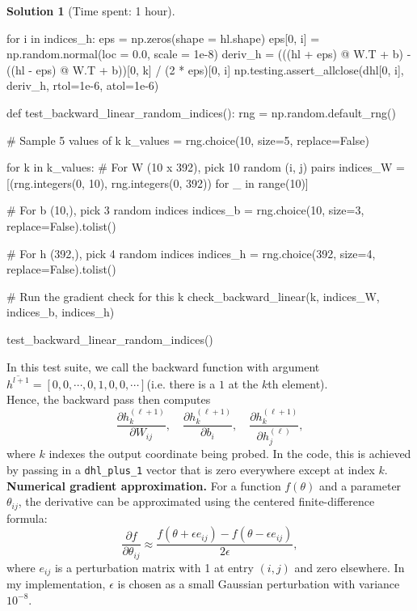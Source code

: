 \documentclass[11pt, reqno, letterpaper, twoside]{amsart}
\theoremstyle{plain}
\theoremstyle{definition}
\newtheorem{solution}[theorem]{Solution}
\begin{document}
\begin{solution}[Time spent: 1 hour]
\begin{enumerate}
\begin{python}
    for i in indices_h:
        eps = np.zeros(shape = hl.shape)
        eps[0, i] = np.random.normal(loc = 0.0, scale = 1e-8)
        deriv_h = (((hl + eps) @ W.T + b) - ((hl - eps) @ W.T + b))[0, k] / (2 * eps)[0, i]
        np.testing.assert_allclose(dhl[0, i], deriv_h, rtol=1e-6, atol=1e-6)

def test_backward_linear_random_indices():
    rng = np.random.default_rng()

    # Sample 5 values of k
    k_values = rng.choice(10, size=5, replace=False)

    for k in k_values:
        # For W (10 x 392), pick 10 random (i, j) pairs
        indices_W = [(rng.integers(0, 10), rng.integers(0, 392)) for _ in range(10)]
        
        # For b (10,), pick 3 random indices
        indices_b = rng.choice(10, size=3, replace=False).tolist()
        
        # For h (392,), pick 4 random indices
        indices_h = rng.choice(392, size=4, replace=False).tolist()

        # Run the gradient check for this k
        check_backward_linear(k, indices_W, indices_b, indices_h)

test_backward_linear_random_indices()

\end{python}
In this test suite, we call the backward function with argument $\overline{h^{l + 1}} = \left[0, 0, \cdots, 0, 1, 0, 0, \cdots\right]$(i.e. there is a $1$ at the $k$th element). \\

Hence, the backward pass then computes
\[
\frac{\partial h^{(\ell+1)}_{k}}{\partial W_{ij}}, \quad
\frac{\partial h^{(\ell+1)}_{k}}{\partial b_{i}}, \quad
\frac{\partial h^{(\ell+1)}_{k}}{\partial h^{(\ell)}_{j}},
\]
where $k$ indexes the output coordinate being probed. In the code, this is achieved by passing in a \verb|dhl_plus_1| vector that is zero everywhere except at index $k$. \\

\textbf{Numerical gradient approximation.}
For a function $f(\theta)$ and a parameter $\theta_{ij}$, the derivative can be approximated using the centered finite-difference formula:
\[
\frac{\partial f}{\partial \theta_{ij}}
\approx \frac{f(\theta + \epsilon e_{ij}) - f(\theta - \epsilon e_{ij})}{2\epsilon},
\]
where $e_{ij}$ is a perturbation matrix with 1 at entry $(i,j)$ and zero elsewhere.  
In my implementation, $\epsilon$ is chosen as a small Gaussian perturbation with variance $10^{-8}$. \\


\end{enumerate}
\end{solution}
\end{document}
